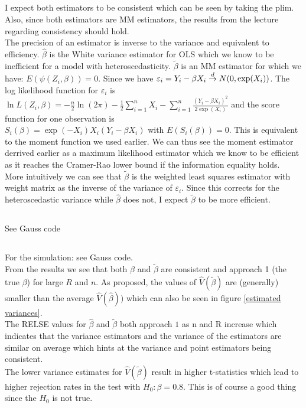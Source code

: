 \documentclass[11pt]{article}
\theoremstyle{break}
\begin{document}
\subsection{}
I expect both estimators to be consistent which can be seen by taking the plim. Also, since both estimators are MM estimators, the results from the lecture regarding consistency should hold. \\
The precision of an estimator is inverse to the variance and equivalent to efficiency. $\hat{\beta}$ is the White variance estimator for OLS which we know to be inefficient for a model with heteroscedasticity. $\tilde{\beta}$ is an MM estimator for which we have: $E(\psi(Z_i, \beta)) = 0$. Since we have $\varepsilon_i = Y_i - \beta X_i \;{\buildrel d \over \rightarrow}\; N(0, \exp(X_i))$. The log likelihood function for $\varepsilon_i$ is $\ln L(Z_i, \beta) = -\frac{n}{2}\ln(2\pi) - \frac{1}{2}\displaystyle\sum_{i=1}^n X_i - \displaystyle \sum_{i=1}^n \frac{(Y_i - \beta X_i)^2}{2\exp(X_i)}$ and the score function for one observation is \\
$S_i(\beta) = \exp(-X_i)X_i(Y_i-\beta X_i)$ with $E(S_i(\beta)) = 0$. This is equivalent to the moment function we used earlier. We can thus see the moment estimator derrived earlier as a maximum likelihood estimator which we know to be efficient as it reaches the Cramer-Rao lower bound if the information equality holds. \\
More intuitively we can see that $\tilde{\beta}$ is the weighted least squares estimator with weight matrix as the inverse of the variance of $\varepsilon_i$. Since this corrects for the heteroscedastic variance while $\hat{\beta}$ does not, I expect $\tilde{\beta}$ to be more efficient.

\subsection{}
See Gauss code

\subsection{}
For the simulation: see Gauss code. \\
From the results we see that both $\hat{\beta}$ and $\tilde{\beta}$ are consistent and approach 1 (the true $\beta$) for large $R$ and $n$. As proposed, the values of $\hat{V}(\tilde{\beta})$ are (generally) smaller than the average $\hat{V}(\hat{\beta}))$ which can also be seen in figure \ref{estimated variances}. \\
The RELSE values for $\hat{\beta}$ and $\tilde{\beta}$ both approach $1$ as n and R increase which indicates that the variance estimators and the variance of the estimators are similar on average which hints at the variance and point estimators being consistent. \\
The lower variance estimates for $\hat{V}(\tilde{\beta})$ result in higher t-statistics which lead to higher rejection rates in the test with $H_0:\beta=0.8$. This is of course a good thing since the $H_0$ is not true. \\
\end{document}

